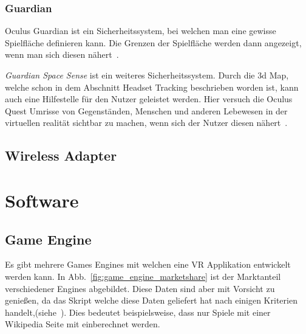 \subsubsection{Guardian}

Oculus Guardian ist ein Sicherheitssystem, bei welchen man eine gewisse Spielfläche definieren kann.
Die Grenzen der Spielfläche werden dann angezeigt, wenn man sich diesen nähert~\cite{Oculus_Guardien}.

\emph{Guardian Space Sense} ist ein weiteres Sicherheitssystem.
Durch die 3d Map, welche schon in dem Abschnitt Headset Tracking beschrieben worden ist, kann auch eine Hilfestelle für den Nutzer geleistet werden.
Hier versuch die Oculus Quest Umrisse von Gegenständen, Menschen und anderen Lebewesen in der virtuellen realität sichtbar zu machen, wenn sich der Nutzer diesen nähert~\cite{Oculus_Guardien}.

\subsection{Wireless Adapter }

\section{Software}

\subsection{Game Engine}

Es gibt mehrere Games Engines mit welchen eine VR Applikation entwickelt werden kann.
In Abb.~\ref{fig:game_engine_marketshare} ist der Marktanteil verschiedener Engines abgebildet.
Diese Daten sind aber mit Vorsicht zu genießen, da das Skript welche diese Daten geliefert hat nach einigen Kriterien handelt,(siehe~\cite{REDDIT_2018}).
Dies bedeutet beispielsweise, dass nur Spiele mit einer Wikipedia Seite mit einberechnet werden.

